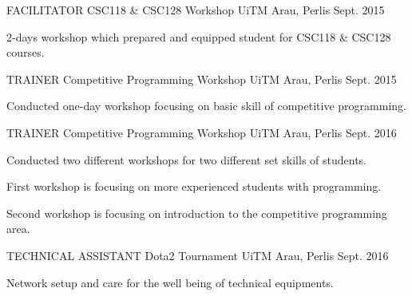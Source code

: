 

\begin{cventries}

  \cventry
    {FACILITATOR}
    {CSC118 \& CSC128 Workshop}
    {UiTM Arau, Perlis}
    {Sept. 2015}
    {
      \begin{cvitems}
        \item {2-days workshop which prepared and equipped student for CSC118 \& CSC128 courses.}
      \end{cvitems}
    }

  \cventry
    {TRAINER}
    {Competitive Programming Workshop}
    {UiTM Arau, Perlis}
    {Sept. 2015}
    {
      \begin{cvitems}
        \item {Conducted one-day workshop focusing on basic skill of competitive programming.}
      \end{cvitems}
    }
    
  \cventry
    {TRAINER}
    {Competitive Programming Workshop}
    {UiTM Arau, Perlis}
    {Sept. 2016}
    {
      \begin{cvitems}
        \item {Conducted two different workshops for two different set skills of students.}
        \item {First workshop is focusing on more experienced students with programming.}
        \item {Second workshop is focusing on introduction to the competitive programming area.}
      \end{cvitems}
    }

  \cventry
    {TECHNICAL ASSISTANT}
    {Dota2 Tournament}
    {UiTM Arau, Perlis}
    {Sept. 2016}
    {
      \begin{cvitems}
        \item {Network setup and care for the well being of technical equipments.}
      \end{cvitems}
    }


\end{cventries}
